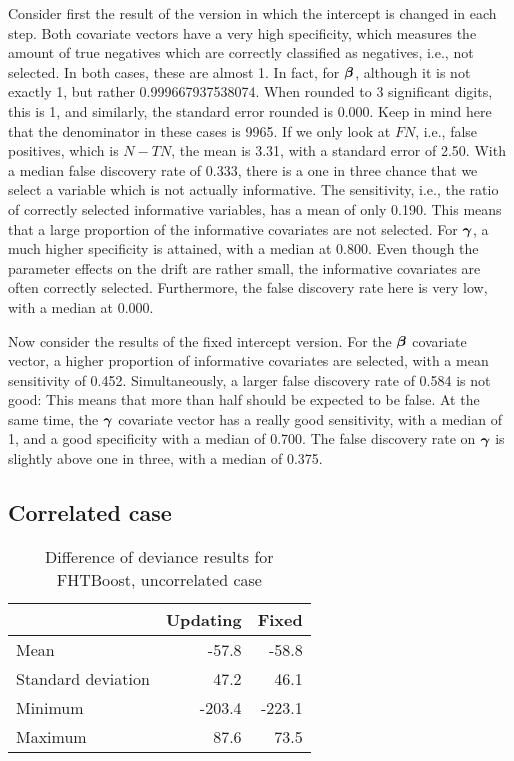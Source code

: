 Consider first the result of the version in which the intercept is changed in each step.
Both covariate vectors have a very high specificity, which measures the amount of true negatives which are correctly classified as negatives, i.e., not selected.
In both cases, these are almost 1.
In fact, for $\boldsymbol{\beta}$, although it is not exactly 1, but rather 0.999667937538074.
When rounded to 3 significant digits, this is 1, and similarly, the standard error rounded is 0.000.
Keep in mind here that the denominator in these cases is 9965.
If we only look at $FN$, i.e., false positives, which is $N-TN$, the mean is 3.31, with a standard error of 2.50.
With a median false discovery rate of 0.333, there is a one in three chance that we select a variable which is not actually informative.
The sensitivity, i.e., the ratio of correctly selected informative variables, has a mean of only 0.190.
This means that a large proportion of the informative covariates are not selected.
For $\boldsymbol{\gamma}$, a much higher specificity is attained, with a median at 0.800.
Even though the parameter effects on the drift are rather small, the informative covariates are often correctly selected.
Furthermore, the false discovery rate here is very low, with a median at 0.000.

Now consider the results of the fixed intercept version.
For the $\boldsymbol{\beta}$ covariate vector, a higher proportion of informative covariates are selected, with a mean sensitivity of 0.452.
Simultaneously, a larger false discovery rate of 0.584 is not good: This means that more than half should be expected to be false.
At the same time, the $\boldsymbol{\gamma}$ covariate vector has a really good sensitivity, with a median of 1, and a good specificity with a median of 0.700.
The false discovery rate on $\boldsymbol{\gamma}$ is slightly above one in three, with a median of 0.375.


\subsection{Correlated case}

\begin{table}
\caption{Difference of deviance results for FHTBoost, uncorrelated case}
\label{table:uncorrelated-deviance}
\centering
\begin{tabular}{l|rr}
\toprule
& Updating & Fixed \\
\hline
Mean               &  -57.8  &  -58.8  \\
Standard deviation &   47.2  &   46.1  \\
Minimum            & -203.4  & -223.1  \\
Maximum            &   87.6  &   73.5  \\
\bottomrule
\end{tabular}
\end{table}

